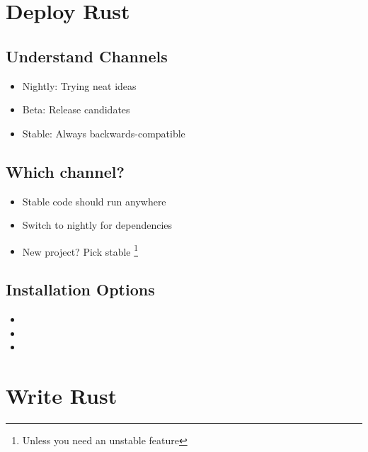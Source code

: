 \documentclass[xcolor={svgnames},hyperref]{beamer}
\begin{document}
\section{Deploy Rust}



    \subsection{Understand Channels}

    \begin{frame}
        \begin{itemize}
            \item Nightly: Trying neat ideas
            \item Beta: Release candidates
            \item Stable: Always backwards-compatible
        \end{itemize}
    \end{frame}

    \subsection{Which channel?}

    \begin{frame}
        \begin{itemize}
            \item Stable code should run anywhere
            \item Switch to nightly for dependencies
            \item New project? Pick stable \footnote{Unless you need an
                  unstable feature}
        \end{itemize}
    \end{frame}


    \subsection{Installation Options}

    \begin{frame}
        \begin{itemize}
            \item
            \item
            \item
        \end{itemize}
    \end{frame}


\section{Write Rust}
\end{document}
